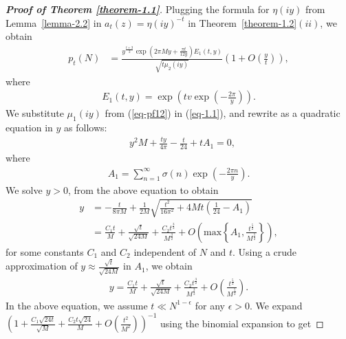 \documentclass[11pt]{amsart}
\theoremstyle{plain}
\numberwithin{equation}{section}
\begin{document}
	\begin{proof}[\textbf{\boldmath Proof of Theorem \ref{theorem-1.1}}]
		Plugging the formula for $\eta(iy)$ from Lemma~\ref{lemma-2.2} in $a_t(z)=\eta(iy)^{-t}$ in Theorem~\ref{theorem-1.2}$(ii)$, we obtain
		\begin{align}\label{eq-ptN4}
			p_t(N)&=\frac{y^{\frac{t+3}{2}}\exp\left(2\pi My+\frac{\pi t}{12y}\right)E_1(t,y)}{\sqrt{t\mu_{2}(iy)}}\left(1+O\left(\frac{y}{t}\right)\right),
		\end{align}
		where
		\begin{align*}%
			E_1(t,y)=\exp\left(tv\exp\left(-\frac{2\pi}{y}\right)\right).
		\end{align*}
		We substitute $\mu_1(iy)$ from (\ref{eq-pf12}) in (\ref{eq-1.1}), and rewrite as a quadratic equation in $y$ as follows:
		\begin{align*}%
			&y^{2}M+\frac{ty}{4\pi}-\frac{t}{24}+tA_1=0,  
		\end{align*}
		where
		\begin{align*}
			A_1=\sum_{n=1}^{\infty} \sigma(n) \exp\left( -\frac{2\pi n}{y} \right) . 
		\end{align*}
		We solve $y>0$, from the above equation to obtain 
		\begin{align*}
			y&=-\frac{t}{8\pi M}+\frac{1}{2M}\sqrt{\frac{t^{2}}{16\pi^{2}}+4Mt\left(\frac{1}{24}-A_1\right)}\\
			&=\frac{C_1 t}{M}+\frac{\sqrt{t}}{\sqrt{24M}}+\frac{C_2t^{\frac{3}{2}}}{M^{\frac{3}{2}}}+O\left(\text{max}\left\{A_1,\frac{t^{\frac{5}{2}}}{M^\frac{5}{2}}\right\}\right),
		\end{align*}
		for some constants $C_1$ and $C_2$ independent of $N$ and $t$. 
		\newline
		Using a crude approximation of $y\approx \frac{\sqrt{t}}{\sqrt{24M}}$ in $A_1$, we obtain
		\begin{align}\label{eq-soly}
			y=\frac{C_1 t}{M}+\frac{\sqrt{t}}{\sqrt{24M}}+\frac{C_2t^{\frac{3}{2}}}{M^{\frac{3}{2}}}+O\left(\frac{t^{\frac{5}{2}}}{M^\frac{5}{2}}\right). 
		\end{align}	
		In the above equation, we assume $t\ll N^{1-\epsilon}$ for any $\epsilon>0$.\newline
		We expand $\left(1+\frac{C_1\sqrt{24t}}{\sqrt{M}}+\frac{C_2t\sqrt{24}}{M}+O\left(\frac{t^{2}}{M^{2}}\right)\right)^{-1}$ using the binomial expansion to get

\end{proof}
\end{document}
